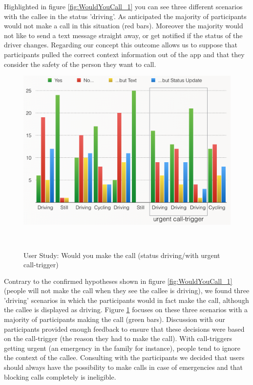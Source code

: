 \documentclass{sigchi}
\begin{document}
Highlighted in figure \ref{fig:WouldYouCall_1} you can see three different scenarios with the callee in the status 'driving'. As anticipated the majority of participants would not make a call in this situation (red bars). Moreover the majority would not like to send a text message straight away, or get notified if the status of the driver changes. Regarding our concept this outcome allows us to suppose that participants pulled the correct context information out of the app and that they consider the safety of the person they want to call.

\begin{figure}[H]
\centering
  \includegraphics[width=0.9\columnwidth]{figures/WouldYouCall_2}
  \caption{User Study: Would you make the call (status driving/with urgent call-trigger)}~\label{fig:WouldYouCall_2}
\end{figure}

Contrary to the confirmed hypotheses shown in figure \ref{fig:WouldYouCall_1} (people will not make the call when they see the callee is driving), we found three 'driving' scenarios in which the participants would in fact make the call, although the callee is displayed as driving. Figure \ref{fig:WouldYouCall_2} focuses on these three scenarios with a majority of participants making the call (green bars). Discussion with our participants provided enough feedback to ensure that these decisions were based on the call-trigger (the reason they had to make the call). With call-triggers getting urgent (an emergency in the family for instance), people tend to ignore the context of the callee. Consulting with the participants we decided that users should always have the possibility to make calls in case of emergencies and that blocking calls completely is ineligible.
\end{document}
